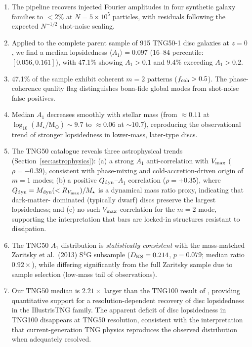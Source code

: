 \documentclass[fleqn,usenatbib]{mnras}
\newcommand{\Am}[1]{A_{#1}}
\newcommand{\Msun}{\mathrm{M}_{\odot}}
\newcommand{\Amone}{\ensuremath{\Am{1}}}
\begin{document}
\begin{enumerate}
  \item The pipeline recovers injected Fourier amplitudes in four
        synthetic galaxy families to $<2\%$ at $N = 5\times10^5$
        particles, with residuals following the expected
        $N^{-1/2}$ shot-noise scaling.
  \item Applied to the complete parent sample of 915 TNG50-1 disc
        galaxies at $z=0$, we find a median lopsidedness
        $\langle \Amone \rangle = 0.097$ (16--84 percentile:
        $[0.056, 0.161]$), with 47.1\% showing $\Amone > 0.1$
        and 9.4\% exceeding $\Amone > 0.2$.
  \item 47.1\% of the sample exhibit coherent $m=2$ patterns
        ($f_{\rm coh} > 0.5$).  The phase-coherence quality flag
        distinguishes bona-fide global modes from shot-noise
        false positives.
  \item Median $\Amone$ decreases smoothly with stellar mass
        (from $\approx 0.11$ at $\log_{10}(M_\star/\Msun) \sim 9.7$
        to $\approx 0.06$ at $\sim 10.7$), reproducing the
        observational trend of stronger lopsidedness in
        lower-mass, later-type discs.
  \item The TNG50 catalogue reveals three astrophysical trends
        (Section~\ref{sec:astrophysics}): (a) a strong $\Amone$
        anti-correlation with $V_{\rm max}$ ($\rho = -0.39$),
        consistent with phase-mixing and cold-accretion-driven
        origin of $m=1$ modes; (b) a positive $Q_{\rm dyn}$--$\Amone$
        correlation ($\rho = +0.35$), where
        $Q_{\rm dyn} = M_{\rm dyn}(<R_{V_{\rm max}})/M_\star$ is a
        dynamical mass ratio proxy, indicating that dark-matter-%
        dominated (typically dwarf) discs preserve the largest
        lopsidedness; and (c)
        no such $V_{\rm max}$-correlation for the $m=2$ mode,
        supporting the interpretation that bars are locked-in
        structures resistant to dissipation.
  \item The TNG50 $\Amone$ distribution is \emph{statistically
        consistent} with the mass-matched Zaritsky et al.\ (2013)
        S$^{4}$G subsample ($D_{\rm KS} = 0.214$, $p = 0.079$;
        median ratio $0.92\times$), while differing significantly
        from the full Zaritsky sample due to sample selection
        (low-mass tail of observations).
  \item Our TNG50 median is $2.21\times$ larger than the TNG100
        result of \citet{2022A&A...662A..53L}, providing quantitative support
        for a resolution-dependent recovery of disc lopsidedness
        in the IllustrisTNG family.  The apparent deficit of
        disc lopsidedness in TNG100 disappears at TNG50
        resolution, consistent with the interpretation that
        current-generation TNG physics reproduces the observed
        distribution when adequately resolved.
\end{enumerate}
\end{document}
